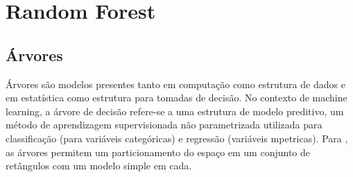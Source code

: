 \section{Random Forest}




\subsection{Árvores}

Árvores são modelos presentes tanto em computação como estrutura de dados e em estatística como estrutura para tomadas de decisão. No contexto de machine learning, a árvore de decisão refere-se a uma estrutura de modelo preditivo, um método de aprendizagem supervisionada não parametrizada utilizada para classificação (para variáveis categóricas) e regressão (variáveis mpetricas). Para , as árvores permitem um particionamento do espaço em um conjunto de retângulos com um modelo simple em cada. 

\begin{comment}
//por figura
Legenda
Neste exemplo \cite{HASTIE}, observa-se que o particionamento num espaço bidimensional, gerando 5 regiões. Ao lado, está a árvore que gerou esse particionamento.
Trata-se de uma representação de regras que dividem as observações em grupos com características em comum. Em geral, considera-se a hipótese de que cada característica possui um domínio finito e discreto.
\end{comment}



